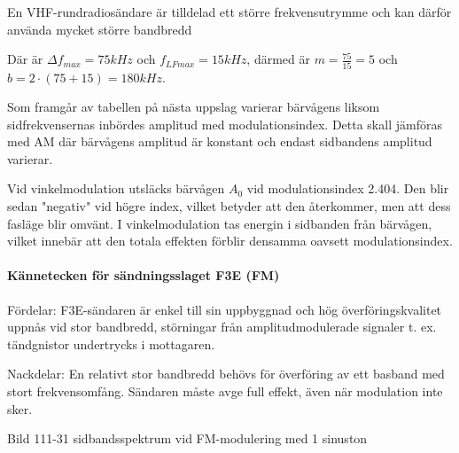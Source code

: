 \documentclass[a4paper,twoside,twocolumn,openright]{book}
\begin{document}
En VHF-rundradiosändare är tilldelad ett större frekvensutrymme och kan därför använda
mycket större bandbredd

Där är $\Delta f_{max} = 75 kHz$ och $f_{LFmax} =15 kHz$, därmed är $m = \frac{75}{15} = 5$
och $b = 2 \cdot (75 + 15) = 180 kHz$.

Som framgår av tabellen på nästa uppslag varierar bärvågens liksom sidfrekvensernas
inbördes amplitud med modulationsindex. Detta skall jämföras med AM där bärvågens amplitud
är konstant och endast sidbandens amplitud varierar.

Vid vinkelmodulation utsläcks bärvågen $A_0$ vid modulationsindex 2.404. Den blir sedan
"negativ" vid högre index, vilket betyder att den återkommer, men att dess fasläge blir
omvänt. I vinkelmodulation tas energin i sidbanden från bärvågen, vilket innebär att
den totala effekten förblir densamma oavsett modulationsindex.

\paragraph{Kännetecken för sändningsslaget F3E (FM)}

Fördelar: F3E-sändaren är enkel till sin uppbyggnad och hög överföringskvalitet
uppnås vid stor bandbredd, störningar från amplitudmodulerade signaler t. ex. tändgnistor
undertrycks i mottagaren.

Nackdelar: En relativt stor bandbredd behövs för överföring av ett basband med
stort frekvensomfång. Sändaren måste avge full effekt, även när modulation inte sker.

Bild 111-31 sidbandsspektrum vid FM-modulering med 1 sinuston
\end{document}
